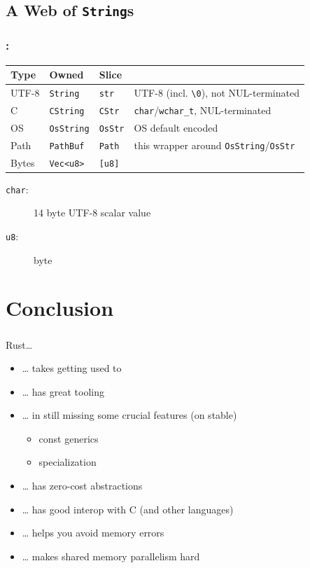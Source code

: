 \documentclass[aspectratio=43, t]{beamer}
\begin{document}
\subsection*{A Web of \texorpdfstring{\texttt{String}}{String}s}
\begin{frame}[c]
	\frametitle{\secname: \subsecname}

	\centering
	\begin{tabular}{l l l l}
		\toprule
		Type  & Owned                       & Slice                    & \\
		\midrule
		UTF-8 & \texttt{String}   & \texttt{str}   & UTF-8 (incl. \texttt{\textbackslash{}0}), not NUL-terminated \\
		C     & \texttt{CString}  & \texttt{CStr}  & \texttt{char}/\texttt{wchar_t}, NUL-terminated \\
		OS    & \texttt{OsString} & \texttt{OsStr} & OS default encoded \\
		Path  & \texttt{PathBuf}  & \texttt{Path}  & this wrapper around \texttt{OsString}/\texttt{OsStr} \\
		Bytes & \texttt{Vec<u8>}  & \texttt{[u8]}  & \\
		\bottomrule
	\end{tabular}

	\vfill

	\begin{description}
		\item[\texttt{char}:] 1\textendash{}4 byte UTF-8 scalar value
		\item[\texttt{u8}:] byte
	\end{description}
\end{frame}

\section*{Conclusion}
\begin{frame}
	\frametitle{\secname}

	Rust…
	\begin{itemize}
		\item … takes getting used to
		\item … has great tooling
		\item … in still missing some crucial features (on stable)
			\begin{itemize}
				\item const generics
				\item specialization
			\end{itemize}
		\item … has zero-cost abstractions
		\item … has good interop with C (and other languages)
		\item … helps you avoid memory errors
		\item … makes shared memory parallelism hard
	\end{itemize}
\end{frame}
\end{document}
